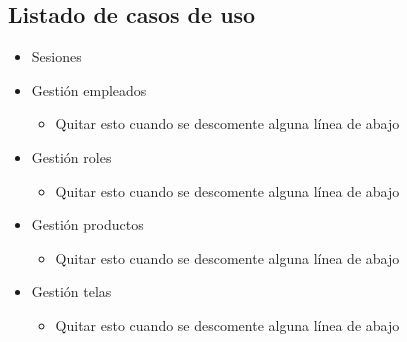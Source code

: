 	\subsection{Listado de casos de uso}
	\label{sec:listadoCasoUso}
	\begin{itemize}
		\item Sesiones
		\begin{itemize}
		\end{itemize}
		\item Gestión empleados
		\begin{itemize}
			\item Quitar esto cuando se descomente alguna línea de abajo
		\end{itemize}
		\item Gestión roles
		\begin{itemize}
			\item Quitar esto cuando se descomente alguna línea de abajo
		\end{itemize}
		\item Gestión productos
		\begin{itemize}
			\item Quitar esto cuando se descomente alguna línea de abajo
		\end{itemize}
		\item Gestión telas
		\begin{itemize}
			\item Quitar esto cuando se descomente alguna línea de abajo

\end{itemize}
\end{itemize}
